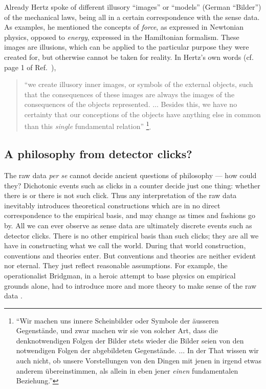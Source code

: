 \documentclass{article}
\begin{document}
Already Hertz \cite{hertz-94} spoke of different illusory ``images'' or ``models''
(German ``Bilder'')
of the mechanical laws, being all in a certain correspondence with the sense data.
As examples, he mentioned the concepts of {\em force}, as expressed in Newtonian physics,
opposed to {\em energy}, expressed in the Hamiltonian formalism.
These images are illusions, which can be applied to the particular purpose they were created for,
but otherwise cannot be taken for reality.
In  Hertz's own words (cf. page 1 of  Ref.~\cite{hertz-94}),
\begin{quote}
{ ``we create illusory inner  images, or symbols of the external objects,
such that the consequences of these images are always
the images of  the consequences of the objects represented.
$\ldots$
Besides this, we have no certainty that our conceptions of the objects
have anything else in common than this {\em single} fundamental relation''}
\footnote{``Wir machen uns innere Scheinbilder oder Symbole der \"ausseren Gegenst\"ande,
und zwar machen wir sie von solcher Art, dass die denknotwendigen Folgen der Bilder stets wieder die Bilder
seien von den notwendigen Folgen der abgebildeten Gegenst\"ande.
$\ldots$
In der That wissen wir auch nicht,
ob unsere Vorstellungen von den Dingen mit jenen in irgend etwas anderem \"ubereinstimmen,
als allein in eben jener {\em einen} fundamentalen
Beziehung.''}.
\end{quote}

\subsection{A philosophy from detector clicks?}

The raw data {\it per se} cannot decide ancient questions of philosophy --- how could they?
Dichotonic events such as clicks in a counter decide just one thing:
whether there is or there is not such click.
Thus any interpretation of the raw data inevitably introduces theoretical constructions which
are in no direct correspondence to the empirical basis,
and may change as times and fashions go by.
All we can ever observe as sense data are ultimately discrete events such as detector clicks.
There is no other empirical basis than such clicks; they are all we have in
constructing what we call the world.
During that world construction, conventions and theories enter.
But conventions and theories are neither evident nor eternal.
They just reflect reasonable assumptions.
For example, the operationalist Bridgman,
in a heroic attempt to base physics on empirical grounds alone,
had to introduce more and more theory to make sense of the raw data
\cite{bridgman27,bridgman,bridgman36,bridgman50,bridgman52}.
\end{document}
